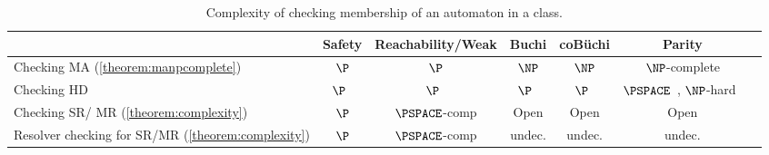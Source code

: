 \fi 

\begin{table*}[t]
\centering
\begin{tabular}{| l || c | c | c | c | c | c | }
\hline
 & Safety & Reachability/Weak & Buchi & coB\"uchi & Parity\\
\hline\hline
\parbox{3cm}{Checking MA (\cref{theorem:manpcomplete})} & $\P$ & $\P$   & $\NP$ & $\NP$  & $\NP$-complete \\
\hline
Checking HD & $\P$~\cite{KS15,BL23quantitative} & $\P$~\cite{KS15,BL23quantitative}    & $\P$~\cite{KS15} & $\P$~\cite{BK18}  & \parbox{2.5cm}{$\PSPACE$~\cite{LP25}, $\NP$-hard~\cite{Pra24a}} \\
\hline
\parbox{3cm}{Checking SR/ MR (\cref{theorem:complexity})} & $\P$ & $\PSPACE$-comp  & Open & Open & Open\\ 			\hline
\parbox{3cm}{Resolver checking for SR/MR (\cref{theorem:complexity})} & $\P$ & $\PSPACE$-comp  & undec. & undec. & undec.\\
  \hline 
\end{tabular}
\caption{Complexity of checking membership of an automaton in a class.}
\label{table:TomwantsTables}
\end{table*}

